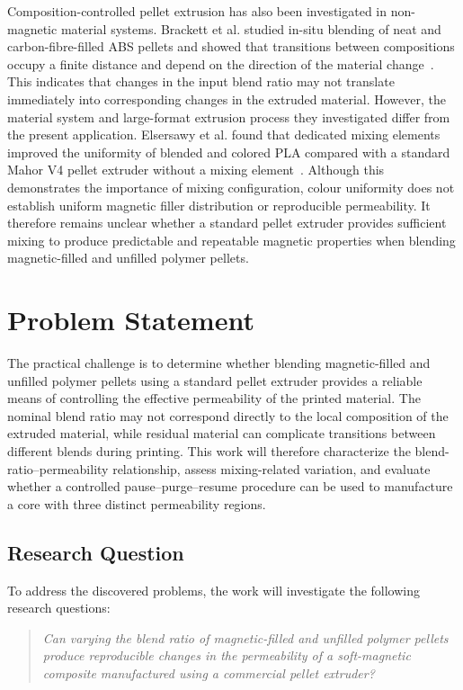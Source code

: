 Composition-controlled pellet extrusion has also been investigated in non-magnetic material systems. Brackett et al. studied in-situ blending of neat and carbon-fibre-filled ABS pellets and showed that transitions between compositions occupy a finite distance and depend on the direction of the material change~\cite{brackettCharacterizingMaterialTransitions2021}. This indicates that changes in the input blend ratio may not translate immediately into corresponding changes in the extruded material. However, the material system and large-format extrusion process they investigated differ from the present application. Elsersawy et al. found that dedicated mixing elements improved the uniformity of blended and colored PLA compared with a standard Mahor V4 pellet extruder without a mixing element~\cite{elsersawyDesignPerformanceAssessment2025}. Although this demonstrates the importance of mixing configuration, colour uniformity does not establish uniform magnetic filler distribution or reproducible permeability. It therefore remains unclear whether a standard pellet extruder provides sufficient mixing to produce predictable and repeatable magnetic properties when blending magnetic-filled and unfilled polymer pellets.


\section{Problem Statement}
The practical challenge is to determine whether blending magnetic-filled and unfilled polymer pellets using a standard pellet extruder provides a reliable means of controlling the effective permeability of the printed material. The nominal blend ratio may not correspond directly to the local composition of the extruded material, while residual material can complicate transitions between different blends during printing. This work will therefore characterize the blend-ratio–permeability relationship, assess mixing-related variation, and evaluate whether a controlled pause–purge–resume procedure can be used to manufacture a core with three distinct permeability regions.

\subsection{Research Question}

To address the discovered problems, the work will investigate the following research questions:

\begin{quote}
  \textit{Can varying the blend ratio of magnetic-filled and unfilled polymer pellets produce reproducible changes in the  permeability of a soft-magnetic composite manufactured using a commercial pellet extruder?} 
\end{quote}

